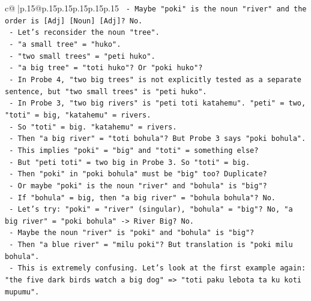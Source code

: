 \documentclass{article}
\begin{document}
{\begin{supertabular}{c@{$\;$}|p{.15\linewidth}@{}p{.15\linewidth}p{.15\linewidth}p{.15\linewidth}p{.15\linewidth}p{.15\linewidth}}
{{{\texttt{                                {-} Maybe "poki" is the noun "river" and the order is {[}Adj{]} {[}Noun{]} {[}Adj{]}? No.} \\
\texttt{                                {-} Let's reconsider the noun "tree".} \\
\texttt{                                {-} "a small tree" = "huko".} \\
\texttt{                                {-} "two small trees" = "peti huko".} \\
\texttt{                                {-} "a big tree" = "toti huko"? Or "poki huko"?} \\
\texttt{                                {-} In Probe 4, "two big trees" is not explicitly tested as a separate sentence, but "two small trees" is "peti huko".} \\
\texttt{                                {-} In Probe 3, "two big rivers" is "peti toti katahemu". "peti" = two, "toti" = big, "katahemu" = rivers.} \\
\texttt{                                {-} So "toti" = big. "katahemu" = rivers.} \\
\texttt{                                {-} Then "a big river" = "toti bohula"? But Probe 3 says "poki bohula".} \\
\texttt{                                {-} This implies "poki" = "big" and "toti" = something else?} \\
\texttt{                                {-} But "peti toti" = two big in Probe 3. So "toti" = big.} \\
\texttt{                                {-} Then "poki" in "poki bohula" must be "big" too? Duplicate?} \\
\texttt{                                {-} Or maybe "poki" is the noun "river" and "bohula" is "big"?} \\
\texttt{                                {-} If "bohula" = big, then "a big river" = "bohula bohula"? No.} \\
\texttt{                                {-} Let's try: "poki" = "river" (singular), "bohula" = "big"? No, "a big river" = "poki bohula" {-}> River Big? No.} \\
\texttt{                                {-} Maybe the noun "river" is "poki" and "bohula" is "big"?} \\
\texttt{                                {-} Then "a blue river" = "milu poki"? But translation is "poki milu bohula".} \\
\texttt{                                {-} This is extremely confusing. Let's look at the first example again: "the five dark birds watch a big dog" => "toti paku lebota ta ku koti mupumu".} \\
}}}
\end{supertabular}}
\end{document}
